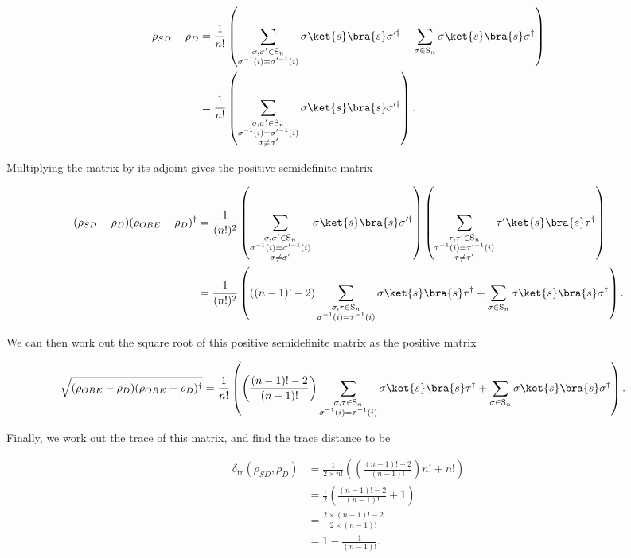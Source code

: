 \begin{align}
\rho_{SD} - \rho_D &= \frac{1}{n!}\left(\sum_{\substack{\sigma,\sigma'\in\textrm{S}_n\\\sigma^{-1}(i)=\sigma'^{-1}(i)}}\sigma\ket{s}\bra{s}\sigma'^\dagger - \sum_{\sigma \in \textrm{S}_n}\sigma\ket{s}\bra{s}\sigma^\dagger\right)\\
&= \frac{1}{n!}\left(\sum_{\substack{\sigma,\sigma'\in\textrm{S}_n\\\sigma^{-1}(i)=\sigma'^{-1}(i)\\\sigma\neq\sigma'}}\sigma\ket{s}\bra{s}\sigma'^\dagger\right).
\end{align}

Multiplying the matrix by its adjoint gives the positive semidefinite matrix

\begin{align}
(\rho_{SD} - \rho_D)(\rho_{OBE} - \rho_D)^\dagger &= \frac{1}{(n!)^2}\left(\sum_{\substack{\sigma,\sigma'\in\textrm{S}_n\\\sigma^{-1}(i)=\sigma'^{-1}(i)\\\sigma\neq\sigma'}}\sigma\ket{s}\bra{s}\sigma'^\dagger\right)\left(\sum_{\substack{\tau,\tau'\in\textrm{S}_n\\\tau^{-1}(i)=\tau'^{-1}(i)\\\tau\neq\tau'}}\tau'\ket{s}\bra{s}\tau^\dagger\right)\\
&= \frac{1}{(n!)^2}\left(((n-1)! - 2)\sum_{\substack{\sigma,\tau\in\textrm{S}_n\\\sigma^{-1}(i)=\tau^{-1}(i)}}\sigma\ket{s}\bra{s}\tau^\dagger + \sum_{\sigma \in \textrm{S}_n}\sigma\ket{s}\bra{s}\sigma^\dagger\right).
\end{align}

We can then work out the square root of this positive semidefinite matrix as the positive matrix

\begin{align}
\sqrt{(\rho_{OBE} - \rho_D)(\rho_{OBE} - \rho_D)^\dagger} &= \frac{1}{n!}\left(\left(\frac{(n-1)!-2}{(n-1)!}\right)\sum_{\substack{\sigma,\tau\in\textrm{S}_n\\\sigma^{-1}(i)=\tau^{-1}(i)}}\sigma\ket{s}\bra{s}\tau^\dagger + \sum_{\sigma \in \textrm{S}_n}\sigma\ket{s}\bra{s}\sigma^\dagger\right).
\end{align}

Finally, we work out the trace of this matrix, and find the trace distance to be

\begin{align}
\delta_{\mathrm{tr}}(\rho_{SD}, \rho_D) &= \frac{1}{2\times n!}\left(\left(\frac{(n-1)!-2}{(n-1)!}\right)n! + n!\right)\\
&= \frac{1}{2}\left(\frac{(n-1)!-2}{(n-1)!} + 1\right)\\
&= \frac{2 \times (n-1)! - 2}{2 \times (n-1)!}\\
&= 1 - \frac{1}{(n-1)!}.
\end{align}

